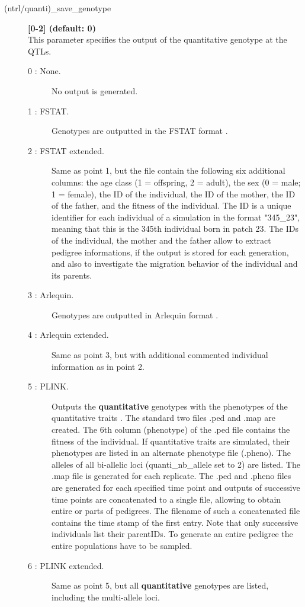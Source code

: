 \documentclass[letterpaper,12pt,oneside]{book}
\begin{document}
\begin{description} 
\item[(ntrl/quanti)\_save\_genotype] \textbf{[0-2] (default: 0)} \\
This parameter specifies the output of the quantitative genotype at the QTLs.
\begin{description}
\item [0 : None.] No output is generated.
\item [1 : FSTAT.] Genotypes are outputted in the FSTAT format \citep{Goudet_1995}. 
\item [2 : FSTAT extended.] Same as point 1, but the file contain the following six additional columns: the age class (1 = offspring, 2 = adult), the sex (0 = male; 1 = female), the ID of the individual, the ID of the mother, the ID of the father, and the fitness of the individual. The ID is a unique identifier for each individual of a simulation in the format "345\_23", meaning that this is the 345th individual born in patch 23. The IDs of the individual, the mother and the father allow to extract pedigree informations, if the output is stored for each generation, and also to investigate the migration behavior of the individual and its parents. 
\item [3 : Arlequin.] Genotypes are outputted in Arlequin format \citep{Excoffier_2010}.
\item [4 : Arlequin extended.] Same as point 3, but with additional commented individual information as in point 2. 
\item [5 : PLINK.] Outputs the \textbf{quantitative} genotypes with the phenotypes of the quantitative traits \citep{Purcell_2007}. The standard two files .ped and .map are created. The 6th column (phenotype) of the .ped file contains the fitness of the individual. If quantitative traits are simulated, their phenotypes are listed in an alternate phenotype file (.pheno). The alleles of all bi-allelic loci (\textsf{quanti\_nb\_allele} set to 2) are listed. The .map file is generated for each replicate. The .ped and .pheno files are generated for each specified time point and outputs of successive time points are concatenated to a single file, allowing to obtain entire or parts of pedigrees. The filename of such a concatenated file contains the time stamp of the first entry. Note that only successive individuals list their parentIDs. To generate an entire pedigree the entire populations have to be sampled. 
\item [6 : PLINK extended.] Same as point 5, but all \textbf{quantitative} genotypes are listed, including the multi-allele loci.
\end{description} 


\end{description}
\end{document}
